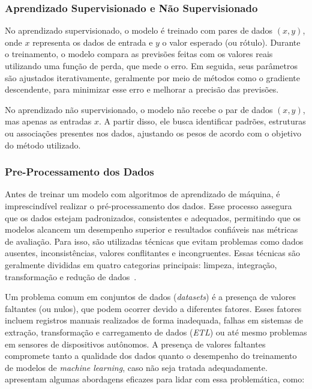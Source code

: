         \subsubsection{Aprendizado Supervisionado e Não Supervisionado}  
            No aprendizado supervisionado, o modelo é treinado com pares de dados \((x,y)\), onde \(x\) representa 
            os dados de entrada e \(y\) o valor esperado (ou rótulo). Durante o treinamento, o modelo compara as 
            previsões feitas com os valores reais utilizando uma função de perda, que mede o erro. Em seguida, 
            seus parâmetros são ajustados iterativamente, geralmente por meio de métodos como o gradiente descendente, 
            para minimizar esse erro e melhorar a precisão das previsões.
            
            No aprendizado não supervisionado, o modelo não recebe o par de dados \((x,y)\), mas apenas as entradas 
            \(x\). A partir disso, ele busca identificar padrões, estruturas ou associações presentes nos dados, 
            ajustando os pesos de acordo com o objetivo do método utilizado.

        
        \subsubsection{Pre-Processamento dos Dados}
            Antes de treinar um modelo com algoritmos de aprendizado de máquina, é imprescindível realizar o pré-processamento 
            dos dados. Esse processo assegura que os dados estejam padronizados, consistentes e adequados, permitindo que os 
            modelos alcancem um desempenho superior e resultados confiáveis nas métricas de avaliação. Para isso, são utilizadas 
            técnicas que evitam problemas como dados ausentes, inconsistências, valores conflitantes e incongruentes. Essas 
            técnicas são geralmente divididas em quatro categorias principais: limpeza, integração, transformação e redução de 
            dados~\cite{silva2021, oliveira2024}.

                Um problema comum em conjuntos de dados (\emph{datasets}) é a presença de valores faltantes (ou nulos), que 
                podem ocorrer devido a diferentes fatores. Esses fatores incluem registros manuais realizados de forma 
                inadequada, falhas em sistemas de extração, transformação e carregamento de dados (\emph{ETL}) ou até mesmo 
                problemas em sensores de dispositivos autônomos. A presença de valores faltantes compromete tanto a qualidade 
                dos dados quanto o desempenho do treinamento de modelos de \emph{machine learning}, caso não seja tratada 
                adequadamente.~ apresentam algumas abordagens eficazes para lidar com essa 
                problemática, como:

